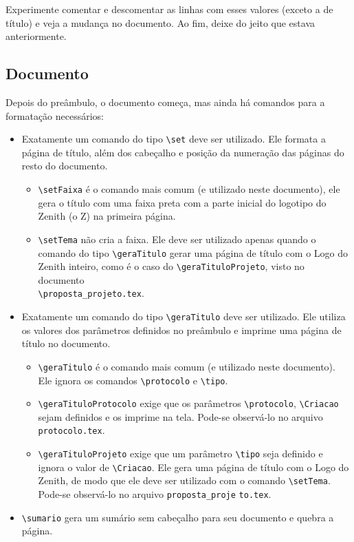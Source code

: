 \documentclass[brazilian, 11pt, oneside, a4paper]{article}
\begin{document}
Experimente comentar e descomentar as linhas com esses valores (exceto a de título) e veja a mudança no documento. Ao fim, deixe do jeito que estava anteriormente.

\subsection{Documento}

Depois do preâmbulo, o documento começa, mas ainda há comandos para a formatação necessários:

\begin{itemize}
    \item Exatamente um comando do tipo \verb$\set$ deve ser utilizado. Ele formata a página de título, além dos cabeçalho e posição da numeração das páginas do resto do documento.
    \begin{itemize}
        \item \verb$\setFaixa$ é o comando mais comum (e utilizado neste documento), ele gera o título com uma faixa preta com a parte inicial do logotipo do Zenith (o Z) na primeira página.
        \item \verb$\setTema$ não cria a faixa. Ele deve ser utilizado apenas quando o comando do tipo \verb$\geraTitulo$ gerar uma página de título com o Logo do Zenith inteiro, como é o caso do \verb$\geraTituloProjeto$, visto no documento \\ \verb$\proposta_projeto.tex$. 
    \end{itemize}
    \item Exatamente um comando do tipo \verb$\geraTitulo$ deve ser utilizado. Ele utiliza os valores dos parâmetros definidos no preâmbulo e imprime uma página de título no documento.
    \begin{itemize}
        \item \verb$\geraTitulo$ é o comando mais comum (e utilizado neste documento). Ele ignora os comandos \verb$\protocolo$ e \verb$\tipo$.
        \item \verb$\geraTituloProtocolo$ exige que os parâmetros \verb$\protocolo$, \verb$\Criacao$ sejam definidos e os imprime na tela. Pode-se observá-lo no arquivo \\ \verb$protocolo.tex$. 
        \item \verb$\geraTituloProjeto$  exige que um parâmetro \verb$\tipo$ seja definido e ignora o valor de \verb$\Criacao$. Ele gera uma página de título com o Logo do Zenith, de modo que ele deve ser utilizado com o comando \verb$\setTema$. Pode-se observá-lo no arquivo \verb$proposta_proje$ \verb$to.tex$.
    \end{itemize}
    \item \verb$\sumario$ gera um sumário sem cabeçalho para seu documento e quebra a página.
\end{itemize}
\end{document}
